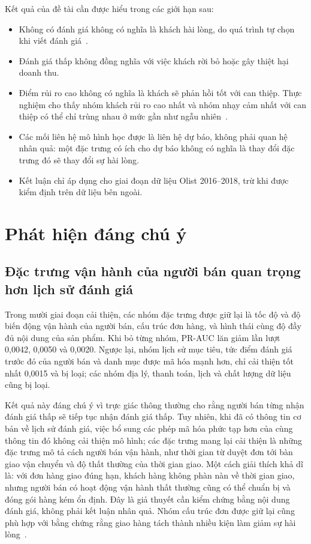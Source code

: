 \documentclass[12pt,a4paper]{report}
\begin{document}
Kết quả của đề tài cần được hiểu trong các giới hạn sau:
\begin{itemize}
  \item Không có đánh giá không có nghĩa là khách hài lòng, do quá trình tự chọn khi viết đánh giá~\cite{li2008}.
  \item Đánh giá thấp không đồng nghĩa với việc khách rời bỏ hoặc gây thiệt hại doanh thu.
  \item Điểm rủi ro cao không có nghĩa là khách sẽ phản hồi tốt với can thiệp. Thực nghiệm cho thấy nhóm khách rủi ro cao nhất và nhóm nhạy cảm nhất với can thiệp có thể chỉ trùng nhau ở mức gần như ngẫu nhiên~\cite{ascarza2018}.
  \item Các mối liên hệ mô hình học được là liên hệ dự báo, không phải quan hệ nhân quả: một đặc trưng có ích cho dự báo không có nghĩa là thay đổi đặc trưng đó sẽ thay đổi sự hài lòng.
  \item Kết luận chỉ áp dụng cho giai đoạn dữ liệu Olist 2016--2018, trừ khi được kiểm định trên dữ liệu bên ngoài.
\end{itemize}

\section{Phát hiện đáng chú ý}\label{sec:disc-findings}

\subsection{Đặc trưng vận hành của người bán quan trọng hơn lịch sử đánh giá}

Trong mười giai đoạn cải thiện, các nhóm đặc trưng được giữ lại là tốc độ và độ biến động vận hành của người bán, cấu trúc đơn hàng, và hình thái cùng độ đầy đủ nội dung của sản phẩm. Khi bỏ từng nhóm, PR-AUC lăn giảm lần lượt 0,0042, 0,0050 và 0,0020. Ngược lại, nhóm lịch sử mục tiêu, tức điểm đánh giá trước đó của người bán và danh mục được mã hóa mạnh hơn, chỉ cải thiện tốt nhất 0,0015 và bị loại; các nhóm địa lý, thanh toán, lịch và chất lượng dữ liệu cũng bị loại.

Kết quả này đáng chú ý vì trực giác thông thường cho rằng người bán từng nhận đánh giá thấp sẽ tiếp tục nhận đánh giá thấp. Tuy nhiên, khi đã có thông tin cơ bản về lịch sử đánh giá, việc bổ sung các phép mã hóa phức tạp hơn của cùng thông tin đó không cải thiện mô hình; các đặc trưng mang lại cải thiện là những đặc trưng mô tả cách người bán vận hành, như thời gian từ duyệt đơn tới bàn giao vận chuyển và độ thất thường của thời gian giao. Một cách giải thích khả dĩ là: với đơn hàng giao đúng hạn, khách hàng không phàn nàn về thời gian giao, nhưng người bán có hoạt động vận hành thất thường cũng có thể chuẩn bị và đóng gói hàng kém ổn định. Đây là giả thuyết cần kiểm chứng bằng nội dung đánh giá, không phải kết luận nhân quả. Nhóm cấu trúc đơn được giữ lại cũng phù hợp với bằng chứng rằng giao hàng tách thành nhiều kiện làm giảm sự hài lòng~\cite{brylla2022}.
\end{document}
